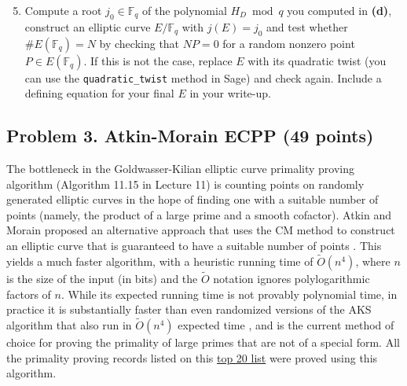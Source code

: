 \documentclass[11pt]{article}
\newcommand{\Fq}{\mathbb{F}_q}
\newcommand{\F}{\mathbb{F}}
\newcommand{\softO}{\widetilde{O}}
\begin{document}
\begin{enumerate}[{\bf(a)}]
\setcounter{enumi}{4}
\item Compute a root $j_0\in \F_q$ of the polynomial $H_D\bmod q$ you computed in \textbf{(d)}, construct an elliptic curve $E/\Fq$ with $j(E)=j_0$ and test whether $\#E(\Fq)=N$  by checking that $NP=0$ for a random nonzero point $P\in E(\Fq)$.  If this is not the case, replace $E$ with its quadratic twist (you can use the \texttt{quadratic\_twist} method in Sage) and check again.  Include a defining equation for your final $E$ in your write-up.
\end{enumerate}


\subsection*{Problem 3. Atkin-Morain ECPP (49 points)}
The bottleneck in the Goldwasser-Kilian elliptic curve primality proving algorithm (Algorithm 11.15 in Lecture 11) is counting points on randomly generated elliptic curves in the hope of finding one with a suitable number of points (namely, the product of a large prime and a smooth cofactor).
Atkin and Morain proposed an alternative approach that uses the CM method to construct an elliptic curve that is guaranteed to have a suitable number of points \cite{AM}.
This yields a much faster algorithm, with a heuristic running time of $\softO(n^4)$, where $n$ is the size of the input (in bits) and the $\softO$ notation ignores polylogarithmic factors of $n$. While its expected running time is not provably polynomial time, in practice it is substantially faster than even randomized versions of the AKS algorithm that also run in $\softO(n^4)$ expected time \cite{bernstein}, and is the current method of choice for proving the primality of large primes that are not of a special form.
All the primality proving records listed on this \href{https://primes.utm.edu/top20/page.php?id=27}{top 20 list} were proved using this algorithm.
\medskip
\end{document}
